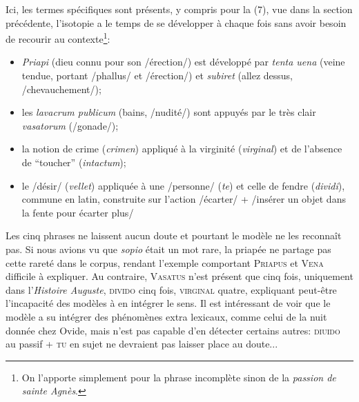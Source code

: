 Ici, les termes spécifiques sont présents, y compris pour la (7), vue dans la section précédente, l'isotopie a le temps de se développer à chaque fois sans avoir besoin de recourir au contexte\footnote{On l'apporte simplement pour la phrase incomplète sinon de la \textit{passion de sainte Agnès}.}:
\begin{itemize}
    \item \textit{Priapi} (dieu connu pour son /érection/) est développé par \textit{tenta uena} (veine tendue, portant /phallus/ et /érection/) et \textit{subiret} (allez dessus, /chevauchement/);
    \item les \textit{lavacrum publicum} (bains, /nudité/) sont appuyés par le très clair \textit{vasatorum} (/gonade/);
    \item la notion de crime (\textit{crimen}) appliqué à la virginité (\textit{virginal}) et de l'absence de \enquote{toucher} (\textit{intactum});
    \item le /désir/ (\textit{vellet}) appliquée à une /personne/ (\textit{te}) et celle de fendre (\textit{dividi}), commune en latin, construite sur l'action /écarter/ + /insérer un objet dans la fente pour écarter plus/
\end{itemize}

Les cinq phrases ne laissent aucun doute et pourtant le modèle ne les reconnaît pas. Si nous avions vu que \textit{sopio} était un mot rare, la priapée ne partage pas cette rareté dans le corpus, rendant l'exemple comportant \textsc{Priapus} et \textsc{Vena} difficile à expliquer. Au contraire, \textsc{Vasatus} n'est présent que cinq fois, uniquement dans l'\textit{Histoire Auguste}, \textsc{divido} cinq fois, \textsc{virginal} quatre, expliquant peut-être l'incapacité des modèles à en intégrer le sens. Il est intéressant de voir que le modèle a su intégrer des phénomènes extra lexicaux, comme celui de la nuit donnée chez Ovide, mais n'est pas capable d'en détecter certains autres: \textsc{diuido} au passif + \textsc{tu} en sujet ne devraient pas laisser place au doute... 

